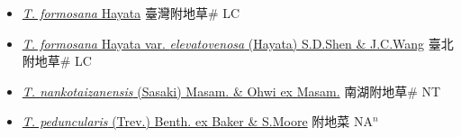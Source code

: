 \begin{itemize}
  \begin{itemize}
        \item[] \href{http://www.theplantlist.org/tpl1.1/search?q=Trigonotis+formosana}{\textit{T. formosana} Hayata}   臺灣附地草\# LC
        \item[] \href{http://www.theplantlist.org/tpl1.1/search?q=Trigonotis+formosana+var.+elevatovenosa}{\textit{T. formosana} Hayata var. \textit{elevatovenosa} (Hayata) S.D.Shen \& J.C.Wang}   臺北附地草\# LC
        \item[] \href{http://www.theplantlist.org/tpl1.1/search?q=Trigonotis+nankotaizanensis}{\textit{T. nankotaizanensis} (Sasaki) Masam. \& Ohwi ex Masam.}   南湖附地草\# NT
        \item[] \href{http://www.theplantlist.org/tpl1.1/search?q=Trigonotis+peduncularis}{\textit{T. peduncularis} (Trev.) Benth. ex Baker \& S.Moore}   附地菜 NA$^n$
  \end{itemize}
  \end{itemize}
